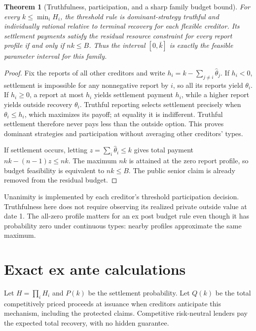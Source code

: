 \documentclass[11pt,a4paper]{article}
\newtheorem{theorem}{Theorem}[section]
\theoremstyle{remark}
\begin{document}
\begin{theorem}[Truthfulness, participation, and a sharp family budget bound]
For every $k\le\min_iH_i$, the threshold rule is dominant-strategy truthful and individually rational relative to terminal recovery for each flexible creditor. Its settlement payments satisfy the residual resource constraint for every report profile if and only if $nk\le B$. Thus the interval $[0,\bar k]$ is exactly the feasible parameter interval for this family.
\end{theorem}
\begin{proof}
Fix the reports of all other creditors and write $h_i=k-\sum_{j\ne i}\widehat\theta_j$. If $h_i<0$, settlement is impossible for any nonnegative report by $i$, so all its reports yield $\theta_i$. If $h_i\ge0$, a report at most $h_i$ yields settlement payment $h_i$, while a higher report yields outside recovery $\theta_i$. Truthful reporting selects settlement precisely when $\theta_i\le h_i$, which maximizes its payoff; at equality it is indifferent. Truthful settlement therefore never pays less than the outside option. This proves dominant strategies and participation without averaging other creditors' types.

If settlement occurs, letting $z=\sum_i\widehat\theta_i\le k$ gives total payment $nk-(n-1)z\le nk$. The maximum $nk$ is attained at the zero report profile, so budget feasibility is equivalent to $nk\le B$. The public senior claim is already removed from the residual budget.
\end{proof}

Unanimity is implemented by each creditor's threshold participation decision. Truthfulness here does not require observing its realized private outside value at date 1. The all-zero profile matters for an ex post budget rule even though it has probability zero under continuous types: nearby profiles approximate the same maximum.

\section{Exact ex ante calculations}
Let $H=\prod_iH_i$ and $P(k)$ be the settlement probability. Let $Q(k)$ be the total competitively priced proceeds at issuance when creditors anticipate this mechanism, including the protected claims. Competitive risk-neutral lenders pay the expected total recovery, with no hidden guarantee.
\end{document}
